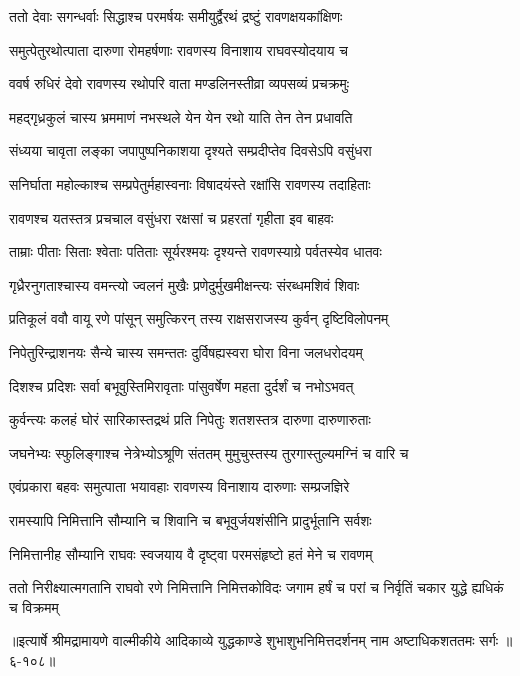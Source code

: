 \twolineshloka
{ततो देवाः सगन्धर्वाः सिद्धाश्च परमर्षयः}
{समीयुर्द्वैरथं द्रष्टुं रावणक्षयकांक्षिणः} %

\twolineshloka
{समुत्पेतुरथोत्पाता दारुणा रोमहर्षणाः}
{रावणस्य विनाशाय राघवस्योदयाय च} %

\twolineshloka
{ववर्ष रुधिरं देवो रावणस्य रथोपरि}
{वाता मण्डलिनस्तीव्रा व्यपसव्यं प्रचक्रमुः} %

\twolineshloka
{महद्गृध्रकुलं चास्य भ्रममाणं नभस्थले}
{येन येन रथो याति तेन तेन प्रधावति} %

\twolineshloka
{संध्यया चावृता लङ्का जपापुष्पनिकाशया}
{दृश्यते सम्प्रदीप्तेव दिवसेऽपि वसुंधरा} %

\twolineshloka
{सनिर्घाता महोल्काश्च सम्प्रपेतुर्महास्वनाः}
{विषादयंस्ते रक्षांसि रावणस्य तदाहिताः} %

\twolineshloka
{रावणश्च यतस्तत्र प्रचचाल वसुंधरा}
{रक्षसां च प्रहरतां गृहीता इव बाहवः} %

\twolineshloka
{ताम्राः पीताः सिताः श्वेताः पतिताः सूर्यरश्मयः}
{दृश्यन्ते रावणस्याग्रे पर्वतस्येव धातवः} %

\twolineshloka
{गृध्रैरनुगताश्चास्य वमन्त्यो ज्वलनं मुखैः}
{प्रणेदुर्मुखमीक्षन्त्यः संरब्धमशिवं शिवाः} %

\twolineshloka
{प्रतिकूलं ववौ वायू रणे पांसून् समुत्किरन्}
{तस्य राक्षसराजस्य कुर्वन् दृष्टिविलोपनम्} %

\twolineshloka
{निपेतुरिन्द्राशनयः सैन्ये चास्य समन्ततः}
{दुर्विषह्यस्वरा घोरा विना जलधरोदयम्} %

\twolineshloka
{दिशश्च प्रदिशः सर्वा बभूवुस्तिमिरावृताः}
{पांसुवर्षेण महता दुर्दर्शं च नभोऽभवत्} %

\twolineshloka
{कुर्वन्त्यः कलहं घोरं सारिकास्तद्रथं प्रति}
{निपेतुः शतशस्तत्र दारुणा दारुणारुताः} %

\twolineshloka
{जघनेभ्यः स्फुलिङ्गाश्च नेत्रेभ्योऽश्रूणि संततम्}
{मुमुचुस्तस्य तुरगास्तुल्यमग्निं च वारि च} %

\twolineshloka
{एवंप्रकारा बहवः समुत्पाता भयावहाः}
{रावणस्य विनाशाय दारुणाः सम्प्रजज्ञिरे} %

\twolineshloka
{रामस्यापि निमित्तानि सौम्यानि च शिवानि च}
{बभूवुर्जयशंसीनि प्रादुर्भूतानि सर्वशः} %

\twolineshloka
{निमित्तानीह सौम्यानि राघवः स्वजयाय वै}
{दृष्ट्वा परमसंहृष्टो हतं मेने च रावणम्} %

\twolineshloka
{ततो निरीक्ष्यात्मगतानि राघवो रणे निमित्तानि निमित्तकोविदः}
{जगाम हर्षं च परां च निर्वृतिं चकार युद्धे ह्यधिकं च विक्रमम्} %


॥इत्यार्षे श्रीमद्रामायणे वाल्मीकीये आदिकाव्ये युद्धकाण्डे शुभाशुभनिमित्तदर्शनम् नाम अष्टाधिकशततमः सर्गः ॥६-१०८॥
